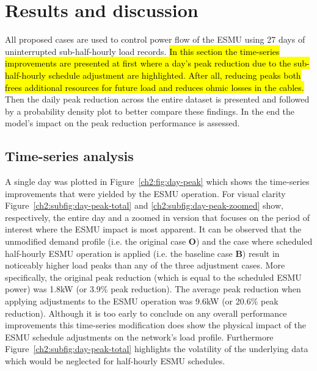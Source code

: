 \section{Results and discussion}
\label{ch2:sec:results}

All proposed cases are used to control power flow of the ESMU using 27 days of uninterrupted sub-half-hourly load records.
\hl{In this section the time-series improvements are presented at first where a day's peak reduction due to the sub-half-hourly schedule adjustment are highlighted.
After all, reducing peaks both frees additional resources for future load and reduces ohmic losses in the cables.}
Then the daily peak reduction across the entire dataset is presented and followed by a probability density plot to better compare these findings.
In the end the model's impact on the peak reduction performance is assessed.

\subsection{Time-series analysis}



A single day was plotted in Figure~\ref{ch2:fig:day-peak} which shows the time-series improvements that were yielded by the ESMU operation.
For visual clarity Figure~\ref{ch2:subfig:day-peak-total} and \ref{ch2:subfig:day-peak-zoomed} show, respectively, the entire day and a zoomed in version that focuses on the period of interest where the ESMU impact is most apparent.
It can be observed that the unmodified demand profile (i.e. the original case  \textbf{O}) and the case where scheduled half-hourly ESMU operation is applied (i.e. the  baseline case \textbf{B}) result in noticeably higher load peaks than any of the three adjustment cases.
More specifically, the original peak reduction (which is equal to the scheduled ESMU power) was 1.8kW (or 3.9\% peak reduction).
The average peak reduction when applying adjustments to the ESMU operation was 9.6kW (or 20.6\% peak reduction).
Although it is too early to conclude on any overall performance improvements this time-series modification does show the physical impact of the ESMU schedule adjustments on the network's load profile.
Furthermore Figure~\ref{ch2:subfig:day-peak-total} highlights the volatility of the underlying data which would be neglected for half-hourly ESMU schedules.

